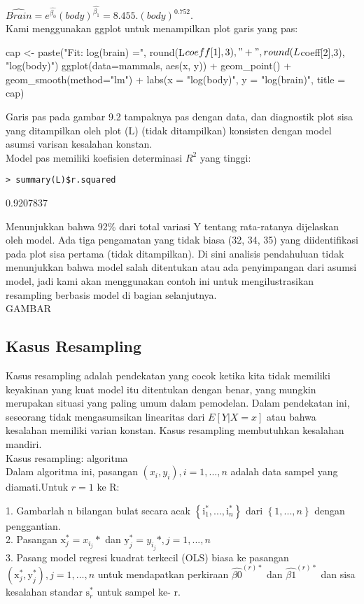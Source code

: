 \documentclass[a4paper,12pt]{article}
\theoremstyle{definition}
\begin{document}
$\widehat{Brain}=e^{\widehat{\beta_0}}(body)^{\widehat{\beta_1}}=8.455.(body)^{0.752}.$\\

Kami menggunakan ggplot untuk menampilkan plot garis yang pas:
\begin{spverbatim}
cap <- paste("Fit: log(brain) =", round(L$coeff[1],3),
"+", round(L$coeff[2],3), "log(body)")
ggplot(data=mammals, aes(x, y)) +
geom_point() + geom_smooth(method="lm") +
labs(x = "log(body)", y = "log(brain)", title = cap)
\end{spverbatim}
Garis pas pada gambar 9.2 tampaknya pas dengan data, dan diagnostik plot sisa yang ditampilkan oleh plot (L) (tidak ditampilkan) konsisten dengan model asumsi varisan kesalahan konstan.\\
Model pas memiliki koefisien determinasi $R^{2}$ yang tinggi:
\begin{lstlisting}
> summary(L)$r.squared
\end{lstlisting}
\begin{spverbatim}
[1] 0.9207837
\end{spverbatim}

Menunjukkan bahwa 92\% dari total variasi Y tentang rata-ratanya dijelaskan oleh model. Ada tiga pengamatan yang tidak biasa (32, 34, 35) yang diidentifikasi pada plot sisa pertama (tidak ditampilkan).
Di sini analisis pendahuluan tidak menunjukkan bahwa model salah ditentukan atau ada penyimpangan dari asumsi model, jadi kami akan menggunakan contoh ini untuk mengilustrasikan resampling berbasis model di bagian selanjutnya.\\

GAMBAR

\subsection{Kasus Resampling}
Kasus resampling adalah pendekatan yang cocok ketika kita tidak memiliki keyakinan yang kuat model itu ditentukan dengan benar, yang mungkin merupakan situasi yang paling umum dalam pemodelan. Dalam pendekatan ini, seseorang tidak mengasumsikan linearitas dari $E[Y |X = x]$ atau bahwa kesalahan memiliki varian konstan. Kasus resampling membutuhkan kesalahan mandiri.\\

Kasus resampling: algoritma\\
Dalam algoritma ini, pasangan $(x_{i},y_{i}), i=1,...,n$ adalah data sampel yang diamati.Untuk $r = 1$ ke R:

1. Gambarlah n bilangan bulat secara acak $\left\{ \mathrm{i}_{1}^{*},...,\mathrm{i}_{n}^{*} \right\}$ dari $\left\{ 1,...,n \right\}$ dengan penggantian.\\
2. Pasangan $\mathrm{x}_{j}^{*}=x_{i_{j}}*$ dan $\mathrm{y}_{j}^{*}=y_{i_{j}}*, j=1,...,n$\\
3. Pasang model regresi kuadrat terkecil (OLS) biasa ke pasangan $\left( \mathrm{x}_{j}^{*},\mathrm{y}_{j}^{*} \right), j=1,...,n$ untuk mendapatkan perkiraan $\widehat{\beta0}^{(r)*}$ dan $\widehat{\beta1}^{(r)*}$ dan sisa kesalahan standar $\mathrm{s}_{r}^{*}$ untuk sampel ke- r.\\
\end{document}
